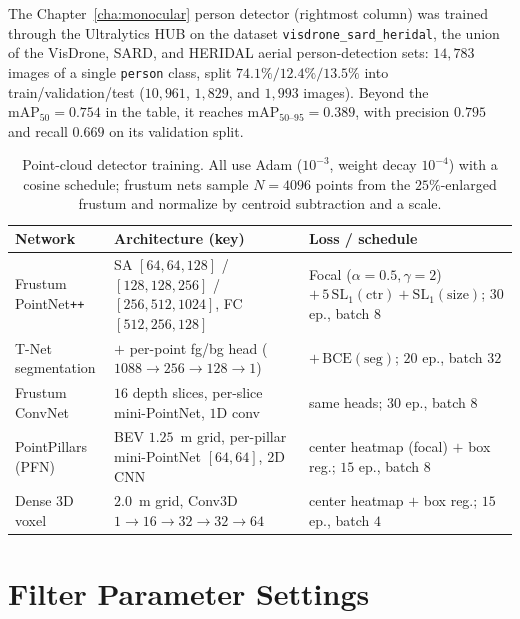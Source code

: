 The Chapter~\ref{cha:monocular} person detector (rightmost column) was trained
through the Ultralytics HUB on the dataset \texttt{visdrone\_sard\_heridal}, the
union of the VisDrone, SARD, and HERIDAL aerial person-detection sets:
$14{,}783$ images of a single \texttt{person} class, split $74.1\%/12.4\%/13.5\%$
into train/validation/test ($10{,}961$, $1{,}829$, and $1{,}993$ images). Beyond
the $\mathrm{mAP}_{50}=0.754$ in the table, it reaches
$\mathrm{mAP}_{50\text{--}95}=0.389$, with precision $0.795$ and recall $0.669$ on
its validation split.

\begin{table}[H]
  \centering
  \footnotesize
  \caption{Point-cloud detector training. All use Adam \cite{kingma2015adam} ($10^{-3}$, weight decay
  $10^{-4}$) with a cosine schedule; frustum nets sample $N{=}4096$ points from
  the $25\%$-enlarged frustum and normalize by centroid subtraction and a scale.}
  \label{tab:hyper_3d}
  \begin{tabular}{@{}p{2.5cm} p{6.3cm} p{5.3cm}@{}}
    \toprule
    Network & Architecture (key) & Loss / schedule \\
    \midrule
    Frustum PointNet\texttt{++}
      & SA $[64,64,128]$ / $[128,128,256]$ / $[256,512,1024]$, FC $[512,256,128]$
      & Focal ($\alpha{=}0.5,\gamma{=}2$) $+\,5\,\mathrm{SL}_1(\text{ctr})+\mathrm{SL}_1(\text{size})$; $30$ ep., batch $8$ \\[2pt]
    T-Net segmentation
      & $+$ per-point fg/bg head ($1088{\to}256{\to}128{\to}1$)
      & $+\,\mathrm{BCE}(\text{seg})$; $20$ ep., batch $32$ \\[2pt]
    Frustum ConvNet
      & $16$ depth slices, per-slice mini-PointNet, $1$D conv
      & same heads; $30$ ep., batch $8$ \\[2pt]
    PointPillars (PFN)
      & BEV $1.25$~m grid, per-pillar mini-PointNet $[64,64]$, 2D CNN
      & center heatmap (focal) $+$ box reg.; $15$ ep., batch $8$ \\[2pt]
    Dense 3D voxel
      & $2.0$~m grid, Conv3D $1{\to}16{\to}32{\to}32{\to}64$
      & center heatmap $+$ box reg.; $15$ ep., batch $4$ \\
    \bottomrule
  \end{tabular}
\end{table}

\section{Filter Parameter Settings}
\label{ap:filter_params}

